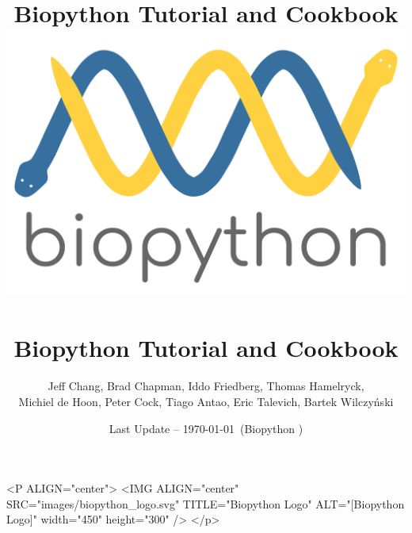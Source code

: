\documentclass{report}
\begin{document}
\begin{htmlonly}
\title{Biopython Tutorial and Cookbook}
\end{htmlonly}
\begin{latexonly}
\title{
\includegraphics[width=\textwidth]{images/biopython_logo.pdf}\\
~\\
Biopython Tutorial and Cookbook}
\end{latexonly}

\author{Jeff Chang, Brad Chapman, Iddo Friedberg, Thomas Hamelryck, \\
Michiel de Hoon, Peter Cock, Tiago Antao, Eric Talevich, Bartek Wilczy\'{n}ski}
\date{Last Update -- \today\ (Biopython \bpversion)}

\begin{rawhtml}
<P ALIGN="center">
<IMG ALIGN="center" SRC="images/biopython_logo.svg" TITLE="Biopython Logo" ALT="[Biopython Logo]" width="450" height="300" />
</p>
\end{rawhtml}

\maketitle
\tableofcontents


























\end{document}
